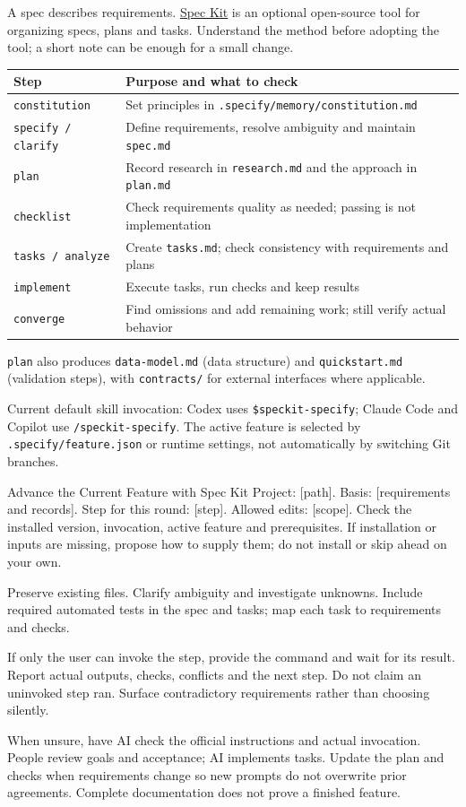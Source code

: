 A spec describes requirements. \href{https://github.com/github/spec-kit}{Spec Kit} is an optional open-source tool for organizing specs, plans and tasks. Understand the method before adopting the tool; a short note can be enough for a small change.
\begin{tabularx}{\linewidth}{@{}L{39mm}Y@{}}
\toprule Step & Purpose and what to check\\\midrule
\texttt{constitution} & Set principles in \texttt{.specify/memory/constitution.md}\\
\texttt{specify / clarify} & Define requirements, resolve ambiguity and maintain \texttt{spec.md}\\
\texttt{plan} & Record research in \texttt{research.md} and the approach in \texttt{plan.md}\\
\texttt{checklist} & Check requirements quality as needed; passing is not implementation\\
\texttt{tasks / analyze} & Create \texttt{tasks.md}; check consistency with requirements and plans\\
\texttt{implement} & Execute tasks, run checks and keep results\\
\texttt{converge} & Find omissions and add remaining work; still verify actual behavior\\
\bottomrule\end{tabularx}
\texttt{plan} also produces \texttt{data-model.md} (data structure) and \texttt{quickstart.md} (validation steps), with \texttt{contracts/} for external interfaces where applicable.

Current default skill invocation: Codex uses \texttt{\$speckit-specify}; Claude Code and Copilot use \texttt{/speckit-specify}. The active feature is selected by \texttt{.specify/feature.json} or runtime settings, not automatically by switching Git branches.
\begin{prompt}{Advance the Current Feature with Spec Kit}
Project: [path]. Basis: [requirements and records]. Step for this round: [step]. Allowed edits: [scope]. Check the installed version, invocation, active feature and prerequisites. If installation or inputs are missing, propose how to supply them; do not install or skip ahead on your own.\par
Preserve existing files. Clarify ambiguity and investigate unknowns. Include required automated tests in the spec and tasks; map each task to requirements and checks.\par
If only the user can invoke the step, provide the command and wait for its result. Report actual outputs, checks, conflicts and the next step. Do not claim an uninvoked step ran. Surface contradictory requirements rather than choosing silently.
\end{prompt}
When unsure, have AI check the official instructions and actual invocation. People review goals and acceptance; AI implements tasks. Update the plan and checks when requirements change so new prompts do not overwrite prior agreements. Complete documentation does not prove a finished feature.
